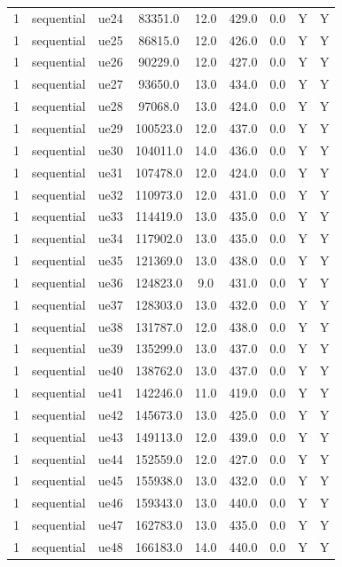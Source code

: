 \begin{table}[ht]
\begin{tabular}{|c|c|c|c|c|c|c|c|c|}
1 & sequential & ue24 & 83351.0 & 12.0 & 429.0 & 0.0 & Y & Y \\
1 & sequential & ue25 & 86815.0 & 12.0 & 426.0 & 0.0 & Y & Y \\
1 & sequential & ue26 & 90229.0 & 12.0 & 427.0 & 0.0 & Y & Y \\
1 & sequential & ue27 & 93650.0 & 13.0 & 434.0 & 0.0 & Y & Y \\
1 & sequential & ue28 & 97068.0 & 13.0 & 424.0 & 0.0 & Y & Y \\
1 & sequential & ue29 & 100523.0 & 12.0 & 437.0 & 0.0 & Y & Y \\
1 & sequential & ue30 & 104011.0 & 14.0 & 436.0 & 0.0 & Y & Y \\
1 & sequential & ue31 & 107478.0 & 12.0 & 424.0 & 0.0 & Y & Y \\
1 & sequential & ue32 & 110973.0 & 12.0 & 431.0 & 0.0 & Y & Y \\
1 & sequential & ue33 & 114419.0 & 13.0 & 435.0 & 0.0 & Y & Y \\
1 & sequential & ue34 & 117902.0 & 13.0 & 435.0 & 0.0 & Y & Y \\
1 & sequential & ue35 & 121369.0 & 13.0 & 438.0 & 0.0 & Y & Y \\
1 & sequential & ue36 & 124823.0 & 9.0 & 431.0 & 0.0 & Y & Y \\
1 & sequential & ue37 & 128303.0 & 13.0 & 432.0 & 0.0 & Y & Y \\
1 & sequential & ue38 & 131787.0 & 12.0 & 438.0 & 0.0 & Y & Y \\
1 & sequential & ue39 & 135299.0 & 13.0 & 437.0 & 0.0 & Y & Y \\
1 & sequential & ue40 & 138762.0 & 13.0 & 437.0 & 0.0 & Y & Y \\
1 & sequential & ue41 & 142246.0 & 11.0 & 419.0 & 0.0 & Y & Y \\
1 & sequential & ue42 & 145673.0 & 13.0 & 425.0 & 0.0 & Y & Y \\
1 & sequential & ue43 & 149113.0 & 12.0 & 439.0 & 0.0 & Y & Y \\
1 & sequential & ue44 & 152559.0 & 12.0 & 427.0 & 0.0 & Y & Y \\
1 & sequential & ue45 & 155938.0 & 13.0 & 432.0 & 0.0 & Y & Y \\
1 & sequential & ue46 & 159343.0 & 13.0 & 440.0 & 0.0 & Y & Y \\
1 & sequential & ue47 & 162783.0 & 13.0 & 435.0 & 0.0 & Y & Y \\
1 & sequential & ue48 & 166183.0 & 14.0 & 440.0 & 0.0 & Y & Y \\

\end{tabular}
\end{table}
